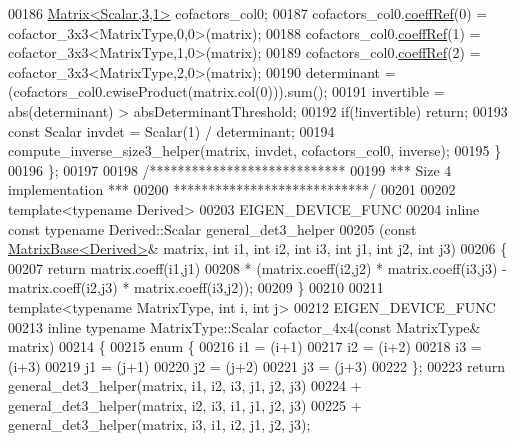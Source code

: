 \begin{DoxyCode}
00186     \hyperlink{group___core___module}{Matrix<Scalar,3,1>} cofactors\_col0;
00187     cofactors\_col0.\hyperlink{class_eigen_1_1_plain_object_base_a25626a55b26a4323565f79d1b7c48ea8}{coeffRef}(0) =  cofactor\_3x3<MatrixType,0,0>(matrix);
00188     cofactors\_col0.\hyperlink{class_eigen_1_1_plain_object_base_a25626a55b26a4323565f79d1b7c48ea8}{coeffRef}(1) =  cofactor\_3x3<MatrixType,1,0>(matrix);
00189     cofactors\_col0.\hyperlink{class_eigen_1_1_plain_object_base_a25626a55b26a4323565f79d1b7c48ea8}{coeffRef}(2) =  cofactor\_3x3<MatrixType,2,0>(matrix);
00190     determinant = (cofactors\_col0.cwiseProduct(matrix.col(0))).sum();
00191     invertible = abs(determinant) > absDeterminantThreshold;
00192     \textcolor{keywordflow}{if}(!invertible) \textcolor{keywordflow}{return};
00193     \textcolor{keyword}{const} Scalar invdet = Scalar(1) / determinant;
00194     compute\_inverse\_size3\_helper(matrix, invdet, cofactors\_col0, inverse);
00195   \}
00196 \};
00197 
00198 \textcolor{comment}{/****************************}
00199 \textcolor{comment}{*** Size 4 implementation ***}
00200 \textcolor{comment}{****************************/}
00201 
00202 \textcolor{keyword}{template}<\textcolor{keyword}{typename} Derived>
00203 EIGEN\_DEVICE\_FUNC 
00204 \textcolor{keyword}{inline} \textcolor{keyword}{const} \textcolor{keyword}{typename} Derived::Scalar general\_det3\_helper
00205 (\textcolor{keyword}{const} \hyperlink{group___core___module_class_eigen_1_1_matrix_base}{MatrixBase<Derived>}& matrix, \textcolor{keywordtype}{int} i1, \textcolor{keywordtype}{int} i2, \textcolor{keywordtype}{int} i3, \textcolor{keywordtype}{int} j1, \textcolor{keywordtype}{int} j2, \textcolor{keywordtype}{int} j3)
00206 \{
00207   \textcolor{keywordflow}{return} matrix.coeff(i1,j1)
00208          * (matrix.coeff(i2,j2) * matrix.coeff(i3,j3) - matrix.coeff(i2,j3) * matrix.coeff(i3,j2));
00209 \}
00210 
00211 \textcolor{keyword}{template}<\textcolor{keyword}{typename} MatrixType, \textcolor{keywordtype}{int} i, \textcolor{keywordtype}{int} j>
00212 EIGEN\_DEVICE\_FUNC 
00213 \textcolor{keyword}{inline} \textcolor{keyword}{typename} MatrixType::Scalar cofactor\_4x4(\textcolor{keyword}{const} MatrixType& matrix)
00214 \{
00215   \textcolor{keyword}{enum} \{
00216     i1 = (i+1) %
00217     i2 = (i+2) %
00218     i3 = (i+3) %
00219     j1 = (j+1) %
00220     j2 = (j+2) %
00221     j3 = (j+3) %
00222   \};
00223   \textcolor{keywordflow}{return} general\_det3\_helper(matrix, i1, i2, i3, j1, j2, j3)
00224        + general\_det3\_helper(matrix, i2, i3, i1, j1, j2, j3)
00225        + general\_det3\_helper(matrix, i3, i1, i2, j1, j2, j3);

\end{DoxyCode}
